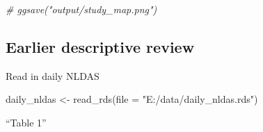 \documentclass[
]{article}
\newenvironment{Shaded}{\begin{snugshade}}{\end{snugshade}}
\newcommand{\AttributeTok}[1]{\textcolor[rgb]{0.77,0.63,0.00}{#1}}
\newcommand{\CommentTok}[1]{\textcolor[rgb]{0.56,0.35,0.01}{\textit{#1}}}
\newcommand{\FunctionTok}[1]{\textcolor[rgb]{0.00,0.00,0.00}{#1}}
\newcommand{\NormalTok}[1]{#1}
\newcommand{\OtherTok}[1]{\textcolor[rgb]{0.56,0.35,0.01}{#1}}
\newcommand{\StringTok}[1]{\textcolor[rgb]{0.31,0.60,0.02}{#1}}
\begin{document}
\begin{Shaded}
\begin{Highlighting}[]
\CommentTok{\# ggsave("output/study\_map.png")}
\end{Highlighting}
\end{Shaded}

\hypertarget{earlier-descriptive-review}{%
\subsection{Earlier descriptive
review}\label{earlier-descriptive-review}}

Read in daily NLDAS

\begin{Shaded}
\begin{Highlighting}[]
\NormalTok{daily\_nldas }\OtherTok{\textless{}{-}} \FunctionTok{read\_rds}\NormalTok{(}\AttributeTok{file =} \StringTok{"E:/data/daily\_nldas.rds"}\NormalTok{)}
\end{Highlighting}
\end{Shaded}

``Table 1''
\end{document}

